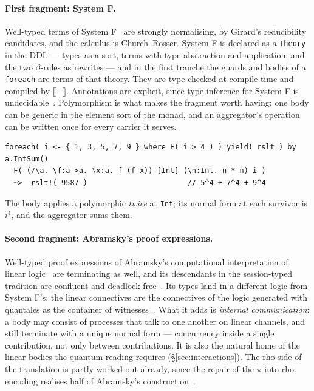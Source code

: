 \documentclass[11pt]{article}
\theoremstyle{definition}
\theoremstyle{plain}
\theoremstyle{remark}
\newcommand{\rhoc}{\textsf{rho}}
\newcommand{\sem}[1]{\llbracket #1 \rrbracket}
\newcommand{\fe}{\texttt{foreach}}
\begin{document}
\paragraph{First fragment: System F.} Well-typed terms of System
F~\cite{GirardLafontTaylor89, Reynolds74} are strongly normalising, by Girard's
reducibility candidates, and the calculus is Church--Rosser. System F is
declared as a \texttt{Theory} in the DDL --- types as a sort, terms with type
abstraction and application, and the two \(\beta\)-rules as rewrites --- and in
the first tranche the guards and bodies of a \fe{} are terms of that theory.
They are type-checked at compile time and compiled by \(\sem{-}\). Annotations
are explicit, since type inference for System F is
undecidable~\cite{Wells99}. Polymorphism is what makes the fragment worth
having: one body can be generic in the element sort of the monad, and an
aggregator's operation can be written once for every carrier it serves.
\begin{lstlisting}
foreach( i <- { 1, 3, 5, 7, 9 } where F( i > 4 ) ) yield( rslt ) by a.IntSum()
  F( (/\a. \f:a->a. \x:a. f (f x)) [Int] (\n:Int. n * n) i )
  ~>  rslt!( 9587 )                       // 5^4 + 7^4 + 9^4
\end{lstlisting}
The body applies a polymorphic \emph{twice} at \texttt{Int}; its normal form at
each survivor is \(i^4\), and the aggregator sums them.

\paragraph{Second fragment: Abramsky's proof expressions.} Well-typed proof
expressions of Abramsky's computational interpretation of linear
logic~\cite{Abramsky94} are terminating as well, and its descendants in the
session-typed tradition are confluent and deadlock-free~\cite{CairesPfenning10,
Wadler12}. Its types land in a different logic from System F's: the linear
connectives are the connectives of the logic generated with quantales as the
container of witnesses~\cite{F1R3Dev}. What it adds is \emph{internal
communication}: a body may consist of processes that talk to one another on
linear channels, and still terminate with a unique normal form --- concurrency
inside a single contribution, not only between contributions. It is also the
natural home of the linear bodies the quantum reading requires
(\S\ref{sec:interactions}). The rho side of the translation is partly worked
out already, since the repair of the \(\pi\)-into-\rhoc{} encoding realises half
of Abramsky's construction~\cite{Namespaces}.
\end{document}
